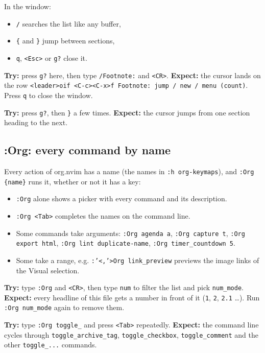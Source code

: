 In the window:
\begin{itemize}
\item \texttt{/} searches the list like any buffer,
\item \texttt{\{} and \texttt{\}} jump between sections,
\item \texttt{q}, \texttt{<Esc>} or \texttt{g?} close it.
\end{itemize}

\textbf{Try:} press \texttt{g?} here, then type \texttt{/Footnote:} and \texttt{<CR>}.
\textbf{Expect:} the cursor lands on the row
\texttt{<leader>oif  <C-c><C-x>f  Footnote: jump / new / menu (count)}.
Press \texttt{q} to close the window.

\textbf{Try:} press \texttt{g?}, then \texttt{\}} a few times.
\textbf{Expect:} the cursor jumps from one section heading to the next.
\subsection{:Org: every command by name}
\label{sec:orga368926}
Every action of org.nvim has a name (the names in \texttt{:h org-keymaps}), and
\texttt{:Org \{name\}} runs it, whether or not it has a key:

\begin{itemize}
\item \texttt{:Org} alone shows a picker with every command and its description.
\item \texttt{:Org <Tab>} completes the names on the command line.
\item Some commands take arguments: \texttt{:Org agenda a}, \texttt{:Org capture t},
\texttt{:Org export html}, \texttt{:Org lint duplicate-name}, \texttt{:Org timer\_countdown 5}.
\item Some take a range, e.g. \texttt{:'<,'>Org link\_preview} previews the image
links of the Visual selection.
\end{itemize}

\textbf{Try:} type \texttt{:Org} and \texttt{<CR>}, then type \texttt{num} to filter the list and pick
\texttt{num\_mode}.
\textbf{Expect:} every headline of this file gets a number in front of it
(\texttt{1}, \texttt{2}, \texttt{2.1} \ldots{}). Run \texttt{:Org num\_mode} again to remove them.

\textbf{Try:} type \texttt{:Org toggle\_} and press \texttt{<Tab>} repeatedly.
\textbf{Expect:} the command line cycles through \texttt{toggle\_archive\_tag},
\texttt{toggle\_checkbox}, \texttt{toggle\_comment} and the other \texttt{toggle\_...} commands.
